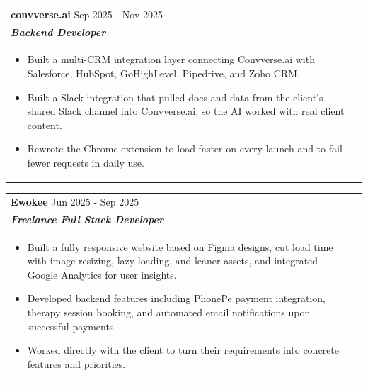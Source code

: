 \documentclass[a4paper,8pt]{article}
\begin{document}

\begin{tabularx}{\linewidth}{ @{}l r@{} }
\color[HTML]{1C033C} \textbf{{convverse.ai}} \hfill \color[HTML]{371e77} Sep 2025 - Nov 2025 \\[4pt]
\color[HTML]{371e77}\textbf{\textit{Backend Developer}}\ \hfill \color[HTML]{4B28A4} \\[5pt]
\begin{minipage}[t]{\linewidth}
    \begin{itemize}[nosep,after=\strut, leftmargin=2em, itemsep=2pt]
        \item Built a multi-CRM integration layer connecting Convverse.ai with Salesforce, HubSpot, GoHighLevel, Pipedrive, and Zoho CRM.
        \item Built a Slack integration that pulled docs and data from the client's shared Slack channel into Convverse.ai, so the AI worked with real client content.
        \item Rewrote the Chrome extension to load faster on every launch and to fail fewer requests in daily use.
    \end{itemize}
\end{minipage}
\end{tabularx}


\begin{tabularx}{\linewidth}{ @{}l r@{} }
\color[HTML]{1C033C} \textbf{{Ewokee}} \hfill \color[HTML]{371e77} Jun 2025 - Sep 2025 \\[4pt]
\color[HTML]{371e77}\textbf{\textit{Freelance Full Stack Developer}}\ \hfill \color[HTML]{4B28A4} \\[5pt]
\begin{minipage}[t]{\linewidth}
    \begin{itemize}[nosep,after=\strut, leftmargin=2em, itemsep=2pt]
        \item Built a fully responsive website based on Figma designs, cut load time with image resizing, lazy loading, and leaner assets, and integrated Google Analytics for user insights.
        \item Developed backend features including PhonePe payment integration, therapy session booking, and automated email notifications upon successful payments.
        \item Worked directly with the client to turn their requirements into concrete features and priorities.
    \end{itemize}
\end{minipage}
\end{tabularx}
\end{document}
